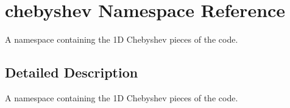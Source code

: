 \hypertarget{namespacechebyshev}{\section{chebyshev Namespace Reference}
\label{namespacechebyshev}
}


A namespace containing the 1\-D Chebyshev pieces of the code.  




\subsection{Detailed Description}
A namespace containing the 1\-D Chebyshev pieces of the code. 

 